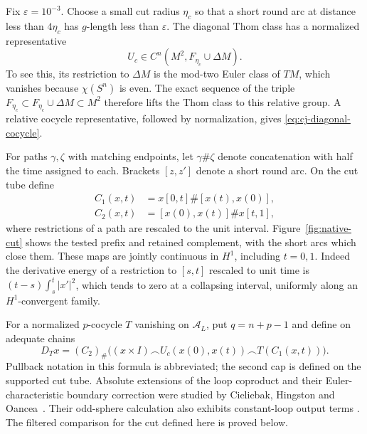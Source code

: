 Fix $\varepsilon=10^{-3}$.  Choose a small cut radius $\eta_c$ so
that a short round arc at distance less than $4\eta_c$ has
$g$-length less than $\varepsilon$.  The diagonal Thom class has
a normalized representative
\begin{equation}\label{eq:cj-diagonal-cocycle}
 U_c\in C^n(M^2,F_{\eta_c}\cup\Delta M).
\end{equation}
To see this, its restriction to $\Delta M$ is the mod-two Euler
class of $TM$, which vanishes because $\chi(S^n)$ is even.  The
exact sequence of the triple
$F_{\eta_c}\subset F_{\eta_c}\cup\Delta M\subset M^2$
therefore lifts the Thom class to this relative group.  A relative
cocycle representative, followed by normalization, gives
\eqref{eq:cj-diagonal-cocycle}.

For paths $\gamma,\zeta$ with matching endpoints, let
$\gamma\#\zeta$ denote concatenation with half the time assigned
to each.  Brackets $[z,z']$ denote a short round arc.  On the cut
tube define
\begin{equation}\label{eq:cj-cut-maps}
 \begin{split}
 C_1(x,t)&=x[0,t]\#[x(t),x(0)],\\
 C_2(x,t)&=[x(0),x(t)]\#x[t,1],
 \end{split}
\end{equation}
where restrictions of a path are rescaled to the unit interval.
Figure~\ref{fig:native-cut} shows the tested prefix and retained
complement, with the short arcs which close them.
These maps are jointly continuous in $H^1$, including $t=0,1$.
Indeed the derivative energy of a restriction to $[s,t]$ rescaled
to unit time is
$(t-s)\int_s^t|x'|^2$, which tends to zero at a collapsing
interval, uniformly along an $H^1$-convergent family.



For a normalized $p$-cocycle $T$ vanishing on $\mathcal A_L$, put
$q=n+p-1$ and define on adequate chains
\begin{equation}\label{eq:cj-cut-definition}
 D_Tx=(C_2)_\#\bigl((x\times I)\frown
 U_c(x(0),x(t))\frown T(C_1(x,t))\bigr).
\end{equation}
Pullback notation in this formula is abbreviated; the second cap
is defined on the supported cut tube.
Absolute extensions of the loop coproduct and their Euler-characteristic
boundary correction were studied by Cieliebak, Hingston and
Oancea~\cite[Section~8.1]{CieliebakHingstonOancea2023}.
Their odd-sphere calculation also exhibits constant-loop output terms
\cite[Proposition~8.3 and Remark~8.4]{CieliebakHingstonOancea2023}.
The filtered comparison for the cut defined here is proved below.

